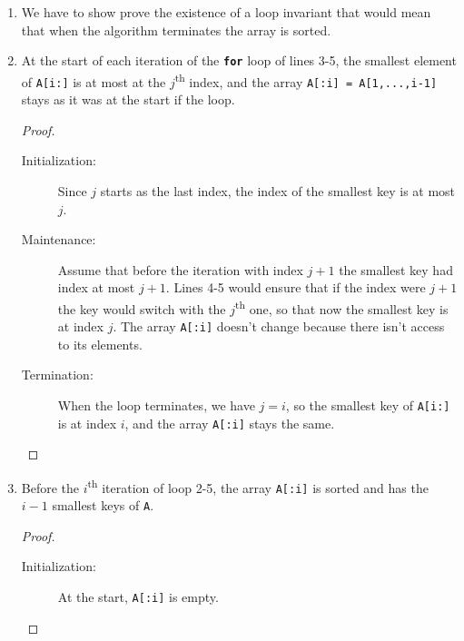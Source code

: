 \documentclass[oneside]{scrbook}
\newcommand{\codeword}[1]{\texttt{#1}}
\theoremstyle{definition}
\begin{document}
\begin{problem}
    \begin{enumerate}[label = \alph*.]
\item
We have to show prove the existence of a loop invariant that would mean that when the algorithm terminates the array is sorted.

\item
\begin{proposition}
At the start of each iteration of the \codeword{\textbf{for}} loop of lines 3-5, the smallest element of \codeword{A[i:]} is at most at the $j$\textsuperscript{th} index, and the array \codeword{A[:i] = A[1,...,i-1]} stays as it was at the start if the loop.
\end{proposition}

\begin{proof}
\begin{description}
\item[Initialization:]
	Since $j$ starts as the last index, the index of the smallest key is at most $j$.

\item[Maintenance:]
	Assume that before the iteration with index $j+1$ the smallest key had index at most $j+1$. Lines 4-5 would ensure that if the index were $j+1$ the key would switch with the $j$\textsuperscript{th} one, so that now the smallest key is at index $j$. The array \codeword{A[:i]} doesn't change because there isn't access to its elements.
	
    \item[Termination:]
    	When the loop terminates, we have $j = i$, so the smallest key of \codeword{A[i:]} is at index $i$, and the array \codeword{A[:i]} stays the same.
    \end{description}
    \end{proof}
    
    \item
    \begin{proposition}
    Before the $i$\textsuperscript{th} iteration of loop 2-5, the array \codeword{A[:i]} is sorted and has the $i-1$ smallest keys of \codeword{A}.
    \end{proposition}
    
    \begin{proof}
    \begin{description}
    \item[Initialization:]
    At the start, \codeword{A[:i]} is empty.
    

\end{description}
\end{proof}
\end{enumerate}
\end{problem}
\end{document}

